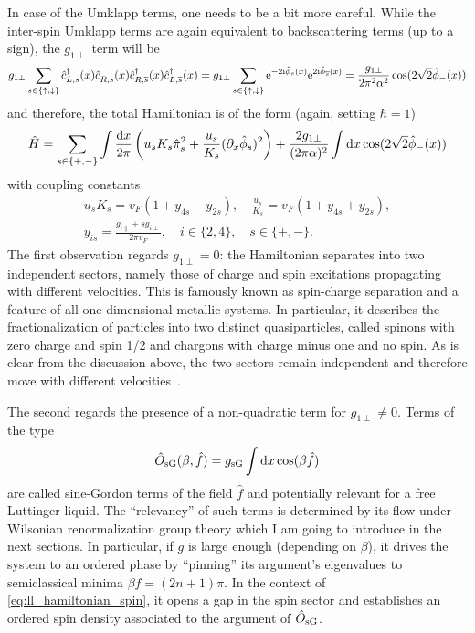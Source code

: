 In case of the Umklapp terms, one needs to be a bit more careful.
While the inter-spin Umklapp terms are again equivalent to backscattering terms (up to a sign), the $g_{1\perp}$ term will be
\begin{align}
    g_{1\perp}\sum_{s\in\{\uparrow,\downarrow\}}\hat c^\dag_{L,s}(x)\hat c^\pdag_{R,s}(x)\hat c^\dag_{R,\overline s}(x)\hat c^\dag_{L,\overline s}(x)
    =
    g_{1\perp}\sum_{s\in\{\uparrow,\downarrow\}}\re^{-2\ri\hat \phi_s(x)}\re^{2\ri\hat \phi_{\overline s}(x)}
    =
    \frac{g_{1\perp}}{2\pi^2\alpha^2}\cos(2\sqrt2\hat \phi_-(x))
\end{align}
and therefore, the total Hamiltonian is of the form (again, setting $\hbar=1$)
\begin{align}
    \hat H = \sum_{s\in\{+,-\}}\int\frac{\mathrm d x}{2\pi}\left( u_s K_s\hat\pi_s^2 + \frac{u_s}{K_s}(\partial_x\hat\phi_s)^2 \right)
    +
    \frac{2g_{1\perp}}{(2\pi\alpha)^2}\int\mathrm d x\cos(2\sqrt2\hat\phi_-(x))
    \label{eq:ll_hamiltonian_spin}
\end{align}
with coupling constants
\begin{align}
    u_sK_s = v_F(1+y_{4s}-y_{2s}),
    \quad
    \frac{u_s}{K_s} = v_F(1+y_{4s}+y_{2s}),
    \\
    y_{is} = \frac{g_{i\parallel}+sg_{i\perp}}{2\pi v_F},
    \quad
    i\in\{2,4\},
    \quad
    s\in\{+,-\}.
\end{align}
The first observation regards $g_{1\perp}=0$: the Hamiltonian separates into two independent sectors, namely those of charge and spin excitations propagating with different velocities.
This is famously known as spin-charge separation and a feature of all one-dimensional metallic systems.
In particular, it describes the fractionalization of particles into two distinct quasiparticles, called spinons with zero charge and spin 1/2 and chargons with charge minus one and no spin.
As is clear from the discussion above, the two sectors remain independent and therefore move with different velocities~\cite{Tomonaga1950,Luttinger1963,Haldane1981,Kim2006}.

The second regards the presence of a non-quadratic term for $g_{1\perp}\neq0$.
Terms of the type
\begin{align}
    \hat O_{\rm sG}(\beta,\hat f) = g_{\rm sG}\int\mathrm d x\cos(\beta\hat f)
\end{align}
are called sine-Gordon terms of the field $\hat f$ and potentially relevant for a free Luttinger liquid.
The ``relevancy'' of such terms is determined by its flow under Wilsonian renormalization group theory which I am going to introduce in the next sections.
In particular, if $g$ is large enough (depending on $\beta$), it drives the system to an ordered phase by ``pinning'' its argument's eigenvalues to semiclassical minima $\beta f=(2n+1)\pi$.
In the context of \cref{eq:ll_hamiltonian_spin}, it opens a gap in the spin sector and establishes an ordered spin density associated to the argument of $\hat O_{\rm sG}$.

